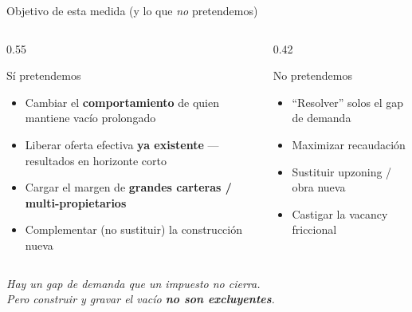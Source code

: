 \documentclass[aspectratio=169,11pt]{beamer}
\begin{document}
\begin{frame}{Objetivo de esta medida (y lo que \emph{no} pretendemos)}
  \begin{columns}[T]
    \begin{column}{0.55\textwidth}
      \begin{exampleblock}{Sí pretendemos}
        \begin{itemize}\setlength\itemsep{0.4em}
          \item Cambiar el \textbf{comportamiento} de quien mantiene vacío prolongado
          \item Liberar oferta efectiva \textbf{ya existente} --- resultados en horizonte corto
          \item Cargar el margen de \textbf{grandes carteras / multi-propietarios}
          \item Complementar (no sustituir) la construcción nueva
        \end{itemize}
      \end{exampleblock}
    \end{column}
    \begin{column}{0.42\textwidth}
      \begin{alertblock}{No pretendemos}
        \begin{itemize}\setlength\itemsep{0.4em}
          \item ``Resolver'' solos el gap de demanda
          \item Maximizar recaudación
          \item Sustituir upzoning / obra nueva
          \item Castigar la vacancy friccional
        \end{itemize}
      \end{alertblock}
    \end{column}
  \end{columns}
  \vspace{0.7em}
  \centering
  \large\textit{Hay un gap de demanda que un impuesto no cierra.\\
  Pero construir y gravar el vacío \textbf{no son excluyentes}.}
\end{frame}
\end{document}
